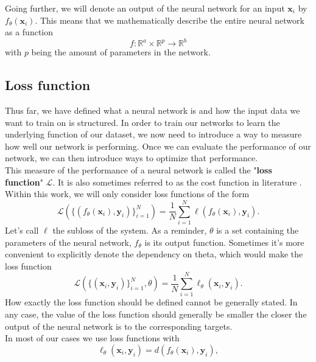 Going further, we will denote an output of the neural network for an input $\mathbf{x}_i$ by $f_\theta(\mathbf{x}_i)$. This means that we mathematically describe the entire neural network as a function
\begin{equation}
	f: \mathbb{R}^a \times \mathbb{R}^p \rightarrow \mathbb{R}^b
\end{equation}
with $p$ being the amount of parameters in the network.
\subsection{Loss function}
Thus far, we have defined what a neural network is and how the input data we want to train on is structured. In order to train our networks to learn the underlying function of our dataset, we now need to introduce a way to measure how well our network is performing. Once we can evaluate the performance of our network, we can then introduce ways to optimize that performance.\\
This measure of the performance of a neural network is called the "\textbf{loss function}" $\mathscr{L}$. It is also sometimes referred to as the cost function in literature \cite{NGD}. Within this work, we will only consider loss functions of the form 
\begin{equation}
	\mathscr{L}\left( \{(f_\theta(\mathbf{x}_i), \mathbf{y}_i)\}_{i=1}^{N} \right) = \frac{1}{N} \sum_{i=1}^{N} \ell\left(f_\theta(\mathbf{x}_i),\mathbf{y}_i\right).
	\label{eq:Loss_longform_withFunctiondependency}
\end{equation}
Let's call $\ell$ the subloss of the system. As a reminder, $\theta$ is a set containing the parameters of the neural network, $f_\theta$ is its output function. Sometimes it's more convenient to explicitly denote the dependency on theta, which would make the loss function
\begin{equation}\label{eq:Loss_longform}
	\mathscr{L}\left( \{(\mathbf{x}_i, \mathbf{y}_i)\}_{i=1}^{N}, \theta \right) = \frac{1}{N} \sum_{i=1}^{N} \ell_\theta\left(\mathbf{x}_i,\mathbf{y}_i\right).
\end{equation}
How exactly the loss function should be defined cannot be generally stated. In any case, the value of the loss function should generally be smaller the closer the output of the neural network is to the corresponding targets.\\
In most of our cases we use loss functions with 
\begin{equation}\label{eq:DistanceLoss}
	\ell_\theta \left( \mathbf{x}_i,\mathbf{y}_i\right) = 
	d\left(f_\theta(\mathbf{x}_i), \mathbf{y}_i\right),
\end{equation}
